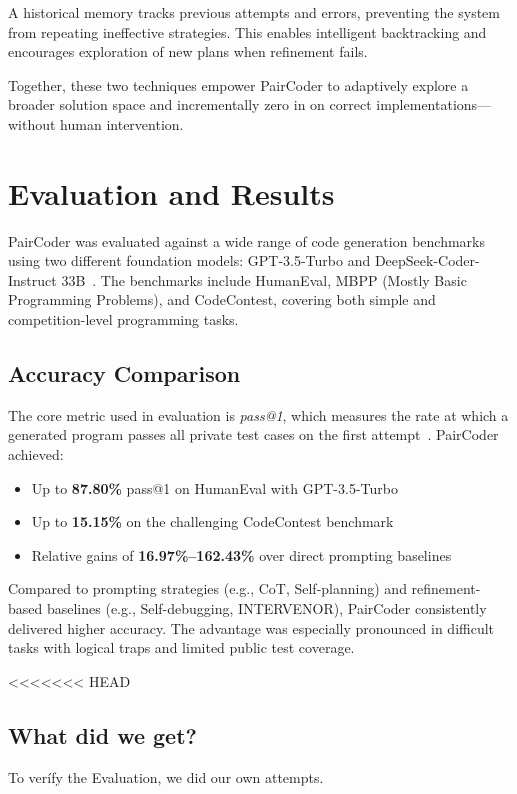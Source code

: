 \documentclass[11pt,a4paper]{article}
\begin{document}
A historical memory tracks previous attempts and errors, preventing the system from repeating ineffective strategies. This enables intelligent backtracking and encourages exploration of new plans when refinement fails.

Together, these two techniques empower PairCoder to adaptively explore a broader solution space and incrementally zero in on correct implementations—without human intervention.
\section{Evaluation and Results}
PairCoder was evaluated against a wide range of code generation benchmarks using two different foundation models: GPT-3.5-Turbo and DeepSeek-Coder-Instruct 33B~\cite{zhang2024paircoder}. The benchmarks include HumanEval, MBPP (Mostly Basic Programming Problems), and CodeContest, covering both simple and competition-level programming tasks.

\subsection{Accuracy Comparison}
The core metric used in evaluation is \textit{pass@1}, which measures the rate at which a generated program passes all private test cases on the first attempt~\cite{zhang2024paircoder}. PairCoder achieved:
\begin{itemize}
\item Up to \textbf{87.80\%} pass@1 on HumanEval with GPT-3.5-Turbo
\item Up to \textbf{15.15\%} on the challenging CodeContest benchmark
\item Relative gains of \textbf{16.97\%–162.43\%} over direct prompting baselines
\end{itemize}

Compared to prompting strategies (e.g., CoT, Self-planning) and refinement-based baselines (e.g., Self-debugging, INTERVENOR), PairCoder consistently delivered higher accuracy. The advantage was especially pronounced in difficult tasks with logical traps and limited public test coverage.

<<<<<<< HEAD
\subsection{What did we get?}

To verífy the Evaluation, we did our own attempts.
\end{document}
